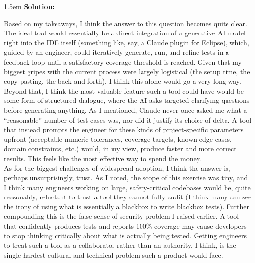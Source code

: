 \documentclass[10pt]{article}
\newcounter{question}
\newenvironment{solution}{
	\vspace{.5em}
	\par
	\begin{adjustwidth}{1.5em}{}
	\textbf{{Solution:}}
	\par
	\vspace{.5em}
}{
	\vspace{1em}
	\end{adjustwidth}
}
\begin{document}
\begin{solution}
	Based on my takeaways, I think the answer to this question becomes quite clear. The ideal tool would essentially be a direct integration of a generative AI model right into the IDE itself (something like, say, a Claude plugin for Eclipse), which, guided by an engineer, could iteratively generate, run, and refine tests in a feedback loop until a satisfactory coverage threshold is reached. Given that my biggest gripes with the current process were largely logistical (the setup time, the copy-pasting, the back-and-forth), I think this alone would go a very long way. \\

	Beyond that, I think the most valuable feature such a tool could have would be some form of structured dialogue, where the AI asks targeted clarifying questions before generating anything. As I mentioned, Claude never once asked me what a ``reasonable'' number of test cases was, nor did it justify its choice of delta. A tool that instead prompts the engineer for these kinds of project-specific parameters upfront (acceptable numeric tolerances, coverage targets, known edge cases, domain constraints, etc.) would, in my view, produce faster and more correct results. This feels like the most effective way to spend the money. \\

	As for the biggest challenges of widespread adoption, I think the answer is, perhaps unsurprisingly, trust. As I noted, the scope of this exercise was tiny, and I think many engineers working on large, safety-critical codebases would be, quite reasonably, reluctant to trust a tool they cannot fully audit (I think many can see the irony of using what is essentially a blackbox to write blackbox tests). Further compounding this is the false sense of security problem I raised earlier. A tool that confidently produces tests and reports 100\% coverage may cause developers to stop thinking critically about what is actually being tested. Getting engineers to treat such a tool as a collaborator rather than an authority, I think, is the single hardest cultural and technical problem such a product would face.
\end{solution}
\end{document}
